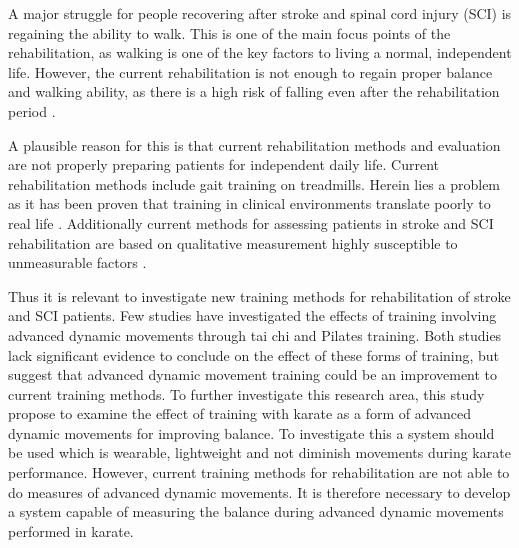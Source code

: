 
A major struggle for people recovering after stroke and spinal cord injury (SCI) is regaining the ability to walk. This is one of the main focus points of the rehabilitation, as walking is one of the key factors to living a normal, independent life. However, the current rehabilitation is not enough to regain proper balance and walking ability, as there is a high risk of falling even after the rehabilitation period \cite{Blennerhassett2012, Hanger2014, Wannapakhe2015, Wong2016, Bhalla2016}.

A plausible reason for this is that current rehabilitation methods and evaluation are not properly preparing patients for independent daily life. Current rehabilitation methods include gait training on treadmills. Herein lies a problem as it has been proven that training in clinical environments translate poorly to real life \cite{Basteris2014}. Additionally current methods for assessing patients in stroke and SCI rehabilitation are based on qualitative measurement highly susceptible to unmeasurable factors \cite{Wang2010, ANPT_SCI2018, ANPT_Stroke2018}. 

Thus it is relevant to investigate new training methods for rehabilitation of stroke and SCI patients. Few studies \cite{Winser2018, Moreno2017} have investigated the effects of training involving advanced dynamic movements through tai chi and Pilates training. Both studies lack significant evidence to conclude on the effect of these forms of training, but suggest that advanced dynamic movement training could be an improvement to current training methods. 
To further investigate this research area, this study propose to examine the effect of training with karate as a form of advanced dynamic movements for improving balance. 
To investigate this a system should be used which is wearable, lightweight and not diminish movements during karate performance. However, current training methods for rehabilitation are not able to do measures of advanced dynamic movements. It is therefore necessary to develop a system capable of measuring the balance during advanced dynamic movements performed in karate. 

